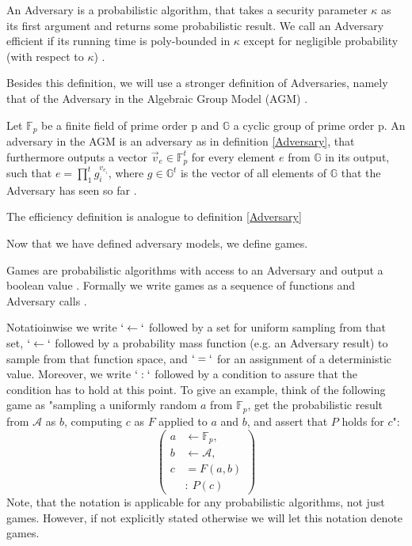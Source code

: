 \begin{definition}
    \label{Adversary}
An Adversary is a probabilistic algorithm, that takes a security parameter $\kappa$ as its first argument and returns some probabilistic result. 
We call an Adversary efficient if its running time is poly-bounded in $\kappa$ except for negligible probability (with respect to $\kappa$)
\parencite{boneh_shoup}.
\end{definition}

Besides this definition, we will use a stronger definition of Adversaries, namely that of the Adversary in the Algebraic Group Model (AGM) \parencite{AGM}.

\begin{definition}
    Let $\mathbb{F}_p$ be a finite field of prime order p and $\mathbb{G}$ a cyclic group of prime order p. An adversary in the AGM is an adversary as in definition \ref{Adversary}, that furthermore outputs a vector $\vec{v}_e \in \mathbb{F}_p^t$ for every element $e$ from $\mathbb{G}$ in its output, such that $e = \prod_{1}^{t} g_i^{v_{e_i}}$, where $g\in \mathbb{G}^t$ is the vector of all elements of $\mathbb{G}$ that the Adversary has seen so far
    \parencite{AGM}. 

    The efficiency definition is analogue to definition \ref*{Adversary}
\end{definition}

Now that we have defined adversary models, we define games. 

\begin{definition}[games]
Games are probabilistic algorithms with access to an Adversary and output a boolean value \parencite{boneh_shoup}. Formally we write games as a sequence of functions and Adversary calls \parencite{boneh_shoup}.
\end{definition}

Notatioinwise we write $`\leftarrow`$ followed by a set for uniform sampling from that set, $`\leftarrow`$ followed by a probability mass function (e.g. an Adversary result) to sample from that function space, and $`=`$ for an assignment of a deterministic value. Moreover, we write $`:`$ followed by a condition to assure that the condition has to hold at this point. To give an example, think of the following game as "sampling a uniformly random $a$ from $\mathbb{F}_p$, get the probabilistic result from $\mathcal{A}$ as $b$, computing $c$ as $F$ applied to $a$ and $b$, and assert that $P$ holds for $c$":
\begin{equation*}
    \left(
    \begin{aligned}
        a & \leftarrow \mathbb{F}_p, \\
        b & \leftarrow \mathcal{A}, \\
        c & = F(a,b) \\
        & : \ P(c)
    \end{aligned}
    \right)
\end{equation*}
Note, that the notation is applicable for any probabilistic algorithms, not just games. However, if not explicitly stated otherwise we will let this notation denote games.

